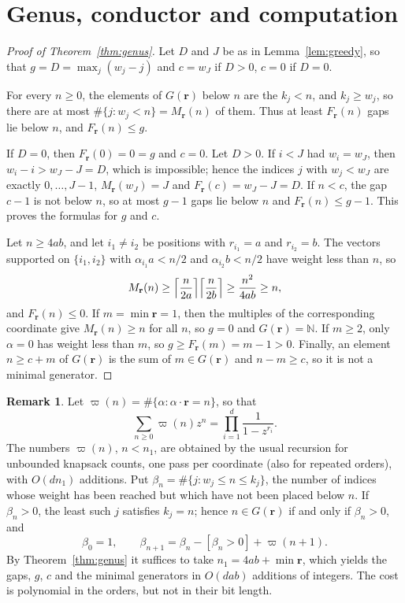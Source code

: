 \documentclass{amsart}
\theoremstyle{definition}
\newtheorem{remark}[theorem]{Remark}
\numberwithin{equation}{section}
\newcommand{\N}{\mathbb{N}}
\newcommand{\bfr}{\mathbf{r}}
\begin{document}
\section{Genus, conductor and computation}\label{sec:genus}

\begin{proof}[Proof of Theorem~\ref{thm:genus}]
Let $D$ and $J$ be as in Lemma~\ref{lem:greedy}, so that $g=D=\max_j(w_j-j)$
and $c=w_J$ if $D>0$, $c=0$ if $D=0$.

For every $n\ge0$, the elements of $G(\bfr)$ below $n$ are the $k_j<n$, and
$k_j\ge w_j$, so there are at most $\#\{j:w_j<n\}=M_{\bfr}(n)$ of them. Thus
at least $F_{\bfr}(n)$ gaps lie below $n$, and $F_{\bfr}(n)\le g$.

If $D=0$, then $F_{\bfr}(0)=0=g$ and $c=0$. Let $D>0$. If $i<J$ had $w_i=w_J$,
then $w_i-i>w_J-J=D$, which is impossible; hence the indices $j$ with
$w_j<w_J$ are exactly $0,\dots,J-1$, $M_{\bfr}(w_J)=J$ and
$F_{\bfr}(c)=w_J-J=D$. If $n<c$, the gap $c-1$ is not below $n$, so at most
$g-1$ gaps lie below $n$ and $F_{\bfr}(n)\le g-1$. This proves the formulas for
$g$ and $c$.

Let $n\ge4ab$, and let $i_1\ne i_2$ be positions with $r_{i_1}=a$ and
$r_{i_2}=b$. The vectors supported on $\{i_1,i_2\}$ with $\alpha_{i_1}a<n/2$ and
$\alpha_{i_2}b<n/2$ have weight less than $n$, so
\[
  M_{\bfr}(n)\ge\Bigl\lceil\frac n{2a}\Bigr\rceil\Bigl\lceil\frac n{2b}\Bigr\rceil
  \ge\frac{n^2}{4ab}\ge n,
\]
and $F_{\bfr}(n)\le0$. If $m=\min\bfr=1$, then the multiples of the
corresponding coordinate give $M_{\bfr}(n)\ge n$ for all $n$, so $g=0$ and
$G(\bfr)=\N$. If $m\ge2$, only $\alpha=0$ has weight less than $m$, so
$g\ge F_{\bfr}(m)=m-1>0$. Finally, an element $n\ge c+m$ of $G(\bfr)$ is the sum
of $m\in G(\bfr)$ and $n-m\ge c$, so it is not a minimal generator.
\end{proof}

\begin{remark}\label{rem:algorithm}
Let $\varpi(n)=\#\{\alpha:\alpha\cdot\bfr=n\}$, so that
\[
  \sum_{n\ge0}\varpi(n)z^n=\prod_{i=1}^d\frac1{1-z^{r_i}}.
\]
The numbers $\varpi(n)$, $n<n_1$, are obtained by the usual recursion for
unbounded knapsack counts, one pass per coordinate (also for repeated orders),
with $O(dn_1)$ additions. Put $\beta_n=\#\{j:w_j\le n\le k_j\}$, the number of
indices whose weight has been reached but which have not been placed below $n$.
If $\beta_n>0$, the least such $j$ satisfies $k_j=n$; hence $n\in G(\bfr)$ if and
only if $\beta_n>0$, and
\[
  \beta_0=1,\qquad \beta_{n+1}=\beta_n-[\beta_n>0]+\varpi(n+1).
\]
By Theorem~\ref{thm:genus} it suffices to take $n_1=4ab+\min\bfr$, which yields
the gaps, $g$, $c$ and the minimal generators in $O(dab)$ additions of
integers. The cost is polynomial in the orders, but not in their bit length.
\end{remark}
\end{document}
